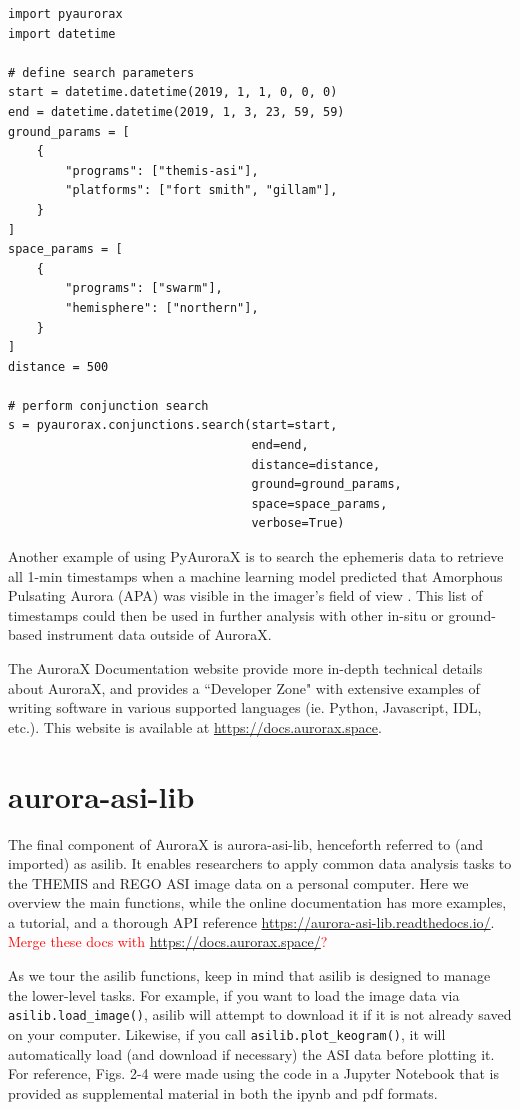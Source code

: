 \documentclass[utf8]{FrontiersinHarvard} %
\begin{document}
\begin{verbatim}
import pyaurorax
import datetime

# define search parameters
start = datetime.datetime(2019, 1, 1, 0, 0, 0)
end = datetime.datetime(2019, 1, 3, 23, 59, 59)
ground_params = [
    {
        "programs": ["themis-asi"],
        "platforms": ["fort smith", "gillam"],
    }
]
space_params = [
    {
        "programs": ["swarm"],
        "hemisphere": ["northern"],
    }
]
distance = 500

# perform conjunction search
s = pyaurorax.conjunctions.search(start=start,
                                  end=end,
                                  distance=distance,
                                  ground=ground_params,
                                  space=space_params,
                                  verbose=True)
\end{verbatim}

Another example of using PyAuroraX is to search the ephemeris data to retrieve all 1-min timestamps when a machine learning model predicted that Amorphous Pulsating Aurora (APA) was visible in the imager's field of view \cite{Grono2020}. This list of timestamps could then be used in further analysis with other in-situ or ground-based instrument data outside of AuroraX.

The AuroraX Documentation website provide more in-depth technical details about AuroraX, and provides a ``Developer Zone" with extensive examples of writing software in various supported languages (ie. Python, Javascript, IDL, etc.). This website is available at \url{https://docs.aurorax.space}.

\section{aurora-asi-lib}\label{aurora-asi-lib}
The final component of AuroraX is aurora-asi-lib, henceforth referred to (and imported) as asilib. It enables researchers to apply common data analysis tasks to the THEMIS and REGO ASI image data on a personal computer. Here we overview the main functions, while the online documentation has more examples, a tutorial, and a thorough API reference \url{https://aurora-asi-lib.readthedocs.io/}. \textcolor{red}{Merge these docs with \url{https://docs.aurorax.space/}?}

As we tour the asilib functions, keep in mind that asilib is designed to manage the lower-level tasks. For example, if you want to load the image data via \verb|asilib.load_image()|, asilib will attempt to download it if it is not already saved on your computer. Likewise, if you call \verb|asilib.plot_keogram()|, it will automatically load (and download if necessary) the ASI data before plotting it. For reference, Figs. 2-4 were made using the code in a Jupyter Notebook that is provided as supplemental material in both the ipynb and pdf formats.
\end{document}
